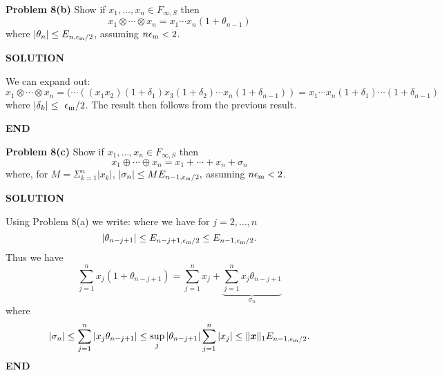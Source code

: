 \documentclass[12pt,a4paper]{article}
\def\x{ {\vc x} }
\begin{document}
\textbf{Problem 8(b)} Show if $x_1,\ensuremath{\ldots},x_n \ensuremath{\in} F_{\ensuremath{\infty},S}$ then
\[
x_1 \ensuremath{\otimes} \ensuremath{\cdots} \ensuremath{\otimes} x_n = x_1 \ensuremath{\cdots} x_n (1 + \ensuremath{\theta}_{n-1})
\]
where $|\ensuremath{\theta}_n| \ensuremath{\leq} E_{n,\ensuremath{\epsilon}_{\rm m}/2}$, assuming $n \ensuremath{\epsilon}_{\rm m} < 2$.

\textbf{SOLUTION}

We can expand out:
\[
x_1 \ensuremath{\otimes} \ensuremath{\cdots} \ensuremath{\otimes} x_n = (\ensuremath{\cdots}((x_1 x_2)(1+\ensuremath{\delta}_1) x_3(1+\ensuremath{\delta}_2)\ensuremath{\cdots} x_n(1+\ensuremath{\delta}_{n-1})) = x_1 \ensuremath{\cdots} x_n (1+\ensuremath{\delta}_1) \ensuremath{\cdots} (1+\ensuremath{\delta}_{n-1})
\]
where $|\ensuremath{\delta}_k| \ensuremath{\leq} \ensuremath{\epsilon}_{\rm m}/2$. The result then follows from the previous result.

\textbf{END}

\textbf{Problem 8(c)} Show if $x_1,\ensuremath{\ldots},x_n \ensuremath{\in} F_{\ensuremath{\infty},S}$ then
\[
x_1 \ensuremath{\oplus} \ensuremath{\cdots} \ensuremath{\oplus} x_n = x_1 +  \ensuremath{\cdots} + x_n + \ensuremath{\sigma}_n
\]
where, for $M = \ensuremath{\Sigma}_{k=1}^n |x_k|$, $|\ensuremath{\sigma}_n| \ensuremath{\leq} M E_{n-1,\ensuremath{\epsilon}_{\rm m}/2},$ assuming $n \ensuremath{\epsilon}_{\rm m} < 2$.

\textbf{SOLUTION}

Using Problem 8(a) we write:
where we have for $j = 2,\ensuremath{\ldots},n$
\[
|\ensuremath{\theta}_{n-j+1}| \ensuremath{\leq} E_{n-j+1,\ensuremath{\epsilon}_{\rm m}/2} \ensuremath{\leq} E_{n-1,\ensuremath{\epsilon}_{\rm m}/2}.
\]
Thus we have 
\[
\ensuremath{\sum}_{j=1}^n x_j (1 + \ensuremath{\theta}_{n-j+1})= \ensuremath{\sum}_{j=1}^n x_j + \underbrace{\ensuremath{\sum}_{j=1}^n x_j \ensuremath{\theta}_{n-j+1}}_{\ensuremath{\sigma}_n}
\]
where
\[
|\ensuremath{\sigma}_n| \ensuremath{\leq}  \ensuremath{\sum}_{j=1}^n |x_j \ensuremath{\theta}_{n-j+1}| \ensuremath{\leq} \sup_j |\ensuremath{\theta}_{n-j+1}| \ensuremath{\sum}_{j=1}^n |x_j|  \ensuremath{\leq} \| \ensuremath{\bm{\x}}\|_1 E_{n-1,\ensuremath{\epsilon}_{\rm m}/2}.
\]
\textbf{END}
\end{document}
